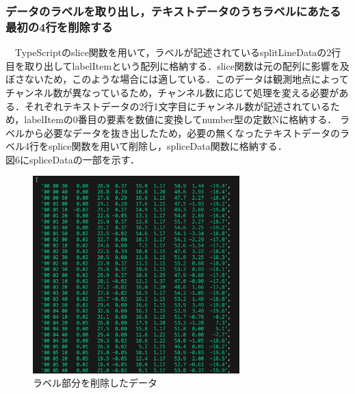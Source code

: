  \subsubsection{データのラベルを取り出し，テキストデータのうちラベルにあたる最初の4行を削除する}
　TypeScriptのslice関数を用いて，ラベルが記述されているsplitLineDataの2行目を取り出してlabelItemという配列に格納する．slice関数は元の配列に影響を及ぼさないため，このような場合には適している．\cite{mdn_slice}このデータは観測地点によってチャンネル数が異なっているため，チャンネル数に応じて処理を変える必要がある．それぞれテキストデータの2行1文字目にチャンネル数が記述されているため，labelItemの0番目の要素を数値に変換してnumber型の定数Nに格納する．
 ラベルから必要なデータを抜き出したため，必要の無くなったテキストデータのラベル4行をsplice関数を用いて削除し，spliceData関数に格納する．\\
 図6にspliceDataの一部を示す．\\
 \begin{figure}[ht]
   \centering
   \includegraphics[width=80mm]{fig/spliceData.png}
   \caption{ラベル部分を削除したデータ}
 \end{figure}
 
